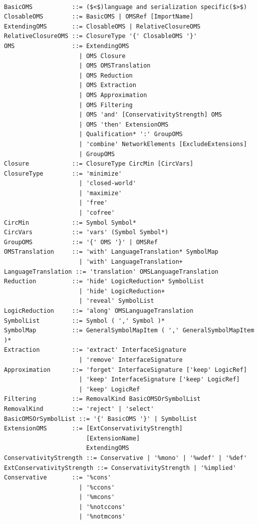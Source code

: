 \documentclass[10pt, a4paper]{isov2}
\begin{document}
\begin{lstlisting}[language=ebnf,escapeinside={()},mathescape]

BasicOMS           ::= ($<$)language and serialization specific($>$) 
ClosableOMS        ::= BasicOMS | OMSRef [ImportName]
ExtendingOMS       ::= ClosableOMS | RelativeClosureOMS
RelativeClosureOMS ::= ClosureType '{' ClosableOMS '}'
OMS                ::= ExtendingOMS
                     | OMS Closure
                     | OMS OMSTranslation
                     | OMS Reduction
                     | OMS Extraction
                     | OMS Approximation
                     | OMS Filtering
                     | OMS 'and' [ConservativityStrength] OMS
                     | OMS 'then' ExtensionOMS
                     | Qualification* ':' GroupOMS
                     | 'combine' NetworkElements [ExcludeExtensions]
                     | GroupOMS
Closure            ::= ClosureType CircMin [CircVars]
ClosureType        ::= 'minimize'
                     | 'closed-world'
                     | 'maximize'
                     | 'free'
                     | 'cofree'
CircMin            ::= Symbol Symbol*
CircVars           ::= 'vars' (Symbol Symbol*)
GroupOMS           ::= '{' OMS '}' | OMSRef
OMSTranslation     ::= 'with' LanguageTranslation* SymbolMap
                     | 'with' LanguageTranslation+
LanguageTranslation ::= 'translation' OMSLanguageTranslation
Reduction          ::= 'hide' LogicReduction* SymbolList
                     | 'hide' LogicReduction+
                     | 'reveal' SymbolList
LogicReduction     ::= 'along' OMSLanguageTranslation
SymbolList         ::= Symbol ( ',' Symbol )*
SymbolMap          ::= GeneralSymbolMapItem ( ',' GeneralSymbolMapItem )*
Extraction         ::= 'extract' InterfaceSignature
                     | 'remove' InterfaceSignature
Approximation      ::= 'forget' InterfaceSignature ['keep' LogicRef]
                     | 'keep' InterfaceSignature ['keep' LogicRef]
                     | 'keep' LogicRef
Filtering          ::= RemovalKind BasicOMSOrSymbolList
RemovalKind        ::= 'reject' | 'select'
BasicOMSOrSymbolList ::= '{' BasicOMS '}' | SymbolList
ExtensionOMS       ::= [ExtConservativityStrength]
                       [ExtensionName]
                       ExtendingOMS
ConservativityStrength ::= Conservative | '%mono' | '%wdef' | '%def'
ExtConservativityStrength ::= ConservativityStrength | '%implied'
Conservative       ::= '%cons'
                     | '%ccons'
                     | '%mcons'
                     | '%notccons'
                     | '%notmcons'

\end{lstlisting}
\end{document}
